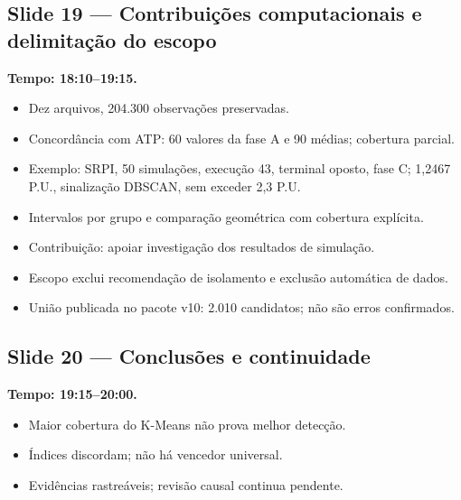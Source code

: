 \documentclass[11pt,a4paper]{article}
\newcommand{\slide}[3]{\Needspace{8\baselineskip}
  \subsection*{Slide #1 --- #2}
  \textbf{Tempo: #3.}\par}
\begin{document}
\slide{19}{Contribuições computacionais e delimitação do escopo}{18:10--19:15}
\begin{itemize}
\item Dez arquivos, 204.300 observações preservadas.
\item Concordância com ATP: 60 valores da fase A e 90 médias; cobertura parcial.
\item Exemplo: SRPI, 50 simulações, execução 43, terminal oposto, fase C;
1,2467 P.U., sinalização DBSCAN, sem exceder 2,3 P.U.
\item Intervalos por grupo e comparação geométrica com cobertura explícita.
\item Contribuição: apoiar investigação dos resultados de simulação.
\item Escopo exclui recomendação de isolamento e exclusão automática de dados.
\item União publicada no pacote v10: 2.010 candidatos; não são erros confirmados.
\end{itemize}

\slide{20}{Conclusões e continuidade}{19:15--20:00}
\begin{itemize}
\item Maior cobertura do K-Means não prova melhor detecção.
\item Índices discordam; não há vencedor universal.
\item Evidências rastreáveis; revisão causal continua pendente.
\end{itemize}
\end{document}
